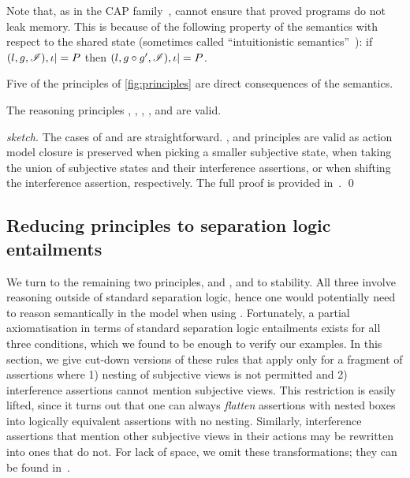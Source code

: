 Note that, as in the CAP family~\cite{cap-ecoop10,icap,tada}, \colosl
cannot ensure that proved programs do not leak memory. This is because
of the following property of the semantics with respect to the shared
state (sometimes called ``intuitionistic semantics''~\cite{rey02}): if
$(l,g,\mathscr{I}), \iota |= P$ then $(l,g\circ g',\mathscr{I}), \iota |= P$.


Five of the principles of \fig\ref{fig:principles} are direct
consequences of the semantics.

\begin{lemma}
  \label{lem:assertion-facts}
  The \colosl reasoning principles 
  \forgetRule, \mergeRule, \shiftRule, \weakenRule, and \copyRule are valid.
\end{lemma}
\begin{proof}[sketch]
  The cases of \weakenRule and \copyRule are
  straightforward. \forgetRule, \mergeRule and \shiftRule principles are valid as action
  model closure is preserved when picking a smaller subjective state, when taking the union of subjective states and their interference assertions, or when shifting the interference assertion, respectively. The full proof is provided in~\cite{colosl-tr14}.
  \qed
\end{proof}


\subsection{Reducing \colosl principles to separation logic entailments}
\label{subsec:prules}

We turn to the remaining two principles, \extendRule and \shiftRule,
and to stability. All three involve reasoning outside of standard
separation logic, hence one would potentially need to reason
semantically in the model when using \colosl. Fortunately, a partial
axiomatisation in terms of standard separation logic entailments
exists for all three conditions, which we found to be enough to verify
our examples. In this section, we give cut-down versions of these
rules that apply only for a fragment of \colosl assertions where 1)
nesting of subjective views is not permitted and 2) interference
assertions cannot mention subjective views. This restriction is easily
lifted, since it turns out that one can always \emph{flatten}
assertions with nested boxes into logically equivalent assertions with
no nesting. Similarly, interference assertions that mention other
subjective views in their actions may be rewritten into ones
that do not. For lack of space, we omit these transformations; they
can be found in~\cite{colosl-tr14}.%

